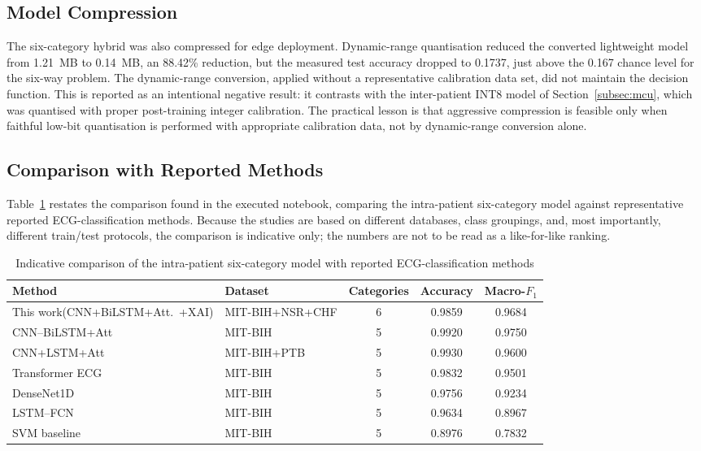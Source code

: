 \subsection{Model Compression}
\label{subsec:intra_compress}

The six-category hybrid was also compressed for edge deployment. Dynamic-range
quantisation reduced the converted lightweight model from 1.21~MB to
0.14~MB, an 88.42\% reduction, but the measured test accuracy dropped to
0.1737, just above the 0.167 chance level for the six-way problem. The dynamic-range
conversion, applied without a representative calibration data set, did not
maintain the decision function. This is reported as an intentional negative
result: it contrasts with the inter-patient INT8 model of
Section~\ref{subsec:mcu}, which was quantised with proper post-training
integer calibration. The practical lesson is that aggressive compression is
feasible only when faithful low-bit quantisation is performed with
appropriate calibration data, not by dynamic-range conversion alone.

\subsection{Comparison with Reported Methods}
\label{subsec:intra_sota}

Table~\ref{tab:sota} restates the comparison found in the executed
notebook, comparing the intra-patient six-category model against representative
reported ECG-classification methods. Because the studies are based on
different databases, class groupings, and, most importantly, different
train/test protocols, the comparison is indicative only; the numbers are
not to be read as a like-for-like ranking.

\begin{table}[!t]
\centering
\caption{Indicative comparison of the intra-patient six-category model with reported ECG-classification methods}
\label{tab:sota}
\setlength{\tabcolsep}{3.5pt}%
\begin{tabular}{@{}>{\raggedright\arraybackslash}p{1.7in}>{\raggedright\arraybackslash}p{1.7in}ccc@{}}
\toprule
\textbf{Method} & \textbf{Dataset} & \textbf{Categories} & \textbf{Accuracy} & \textbf{Macro-$F_1$} \\
\midrule
This work\newline(CNN+BiLSTM+Att.\ +XAI) & MIT-BIH+NSR+CHF & 6 & 0.9859 & 0.9684 \\
CNN--BiLSTM+Att                 & MIT-BIH         & 5 & 0.9920 & 0.9750 \\
CNN+LSTM+Att                    & MIT-BIH+PTB     & 5 & 0.9930 & 0.9600 \\
Transformer ECG                 & MIT-BIH         & 5 & 0.9832 & 0.9501 \\
DenseNet1D                      & MIT-BIH         & 5 & 0.9756 & 0.9234 \\
LSTM--FCN                       & MIT-BIH         & 5 & 0.9634 & 0.8967 \\
SVM baseline                    & MIT-BIH         & 5 & 0.8976 & 0.7832 \\
\bottomrule
\end{tabular}
\end{table}

